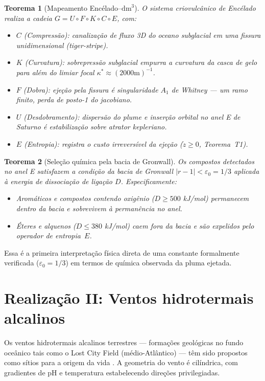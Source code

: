 \documentclass[12pt,a4paper,twoside]{book}
\theoremstyle{plain}
\newtheorem{teorema}{Teorema}[section]
\theoremstyle{definition}
\theoremstyle{definition}
\newcommand{\epsz}{\varepsilon_{0}}
\newcommand{\dm}{\mathrm{dm}^{3}}
\begin{document}
\begin{teorema}[Mapeamento Encélado--$\dm$]\label{thm:enceladus}
O sistema criovulcânico de Encélado realiza a cadeia
$G = U \circ F \circ K \circ C \circ E$, com:
\begin{itemize}
  \item $C$ (Compressão): canalização de fluxo 3D do oceano subglacial
        em uma fissura unidimensional (tiger-stripe).
  \item $K$ (Curvatura): sobrepressão subglacial empurra a curvatura
        da casca de gelo para além do limiar focal
        $\kappa^{\ast} \approx (2000 \text{m})^{-1}$.
  \item $F$ (Dobra): ejeção pela fissura é singularidade $A_{1}$ de
        Whitney --- um ramo finito, perda de posto-1 do jacobiano.
  \item $U$ (Desdobramento): dispersão do plume e inserção orbital no
        anel E de Saturno é estabilização sobre atrator kepleriano.
  \item $E$ (Entropia): registra o custo irreversível da ejeção
        ($\dot z \ge 0$, Teorema~T1).
\end{itemize}
\end{teorema}

\begin{teorema}[Seleção química pela bacia de Gronwall]
\label{thm:enceladus-bacia}
Os compostos detectados no anel E satisfazem a condição da bacia de
Gronwall $|r-1| < \epsz = 1/3$ aplicada à energia de dissociação de
ligação $D$. Especificamente:
\begin{itemize}
  \item Aromáticos e compostos contendo oxigênio ($D \ge 500$ kJ/mol)
        permanecem dentro da bacia e sobrevivem à permanência no anel.
  \item Éteres e alquenos ($D \le 380$ kJ/mol) caem fora da bacia e
        são expelidos pelo operador de entropia~$E$.
\end{itemize}
\end{teorema}

Essa é a primeira interpretação física direta de uma constante
formalmente verificada ($\epsz = 1/3$) em termos de química observada
da pluma ejetada.

\section{Realização II: Ventos hidrotermais alcalinos}

Os ventos hidrotermais alcalinos terrestres --- formações geológicas
no fundo oceânico tais como o Lost City Field (médio-Atlântico) ---
têm sido propostos como sítios para a origem da vida \cite{Russell,Sojo}.
A geometria do vento é cilíndrica, com gradientes de pH e temperatura
estabelecendo direções privilegiadas.
\end{document}
